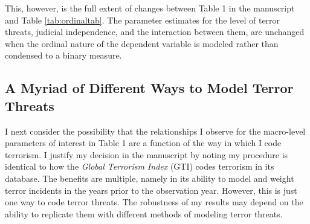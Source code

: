 \documentclass[11pt,]{article}
\begin{document}
This, however, is the full extent of changes between Table 1 in the
manuscript and Table \ref{tab:ordinaltab}. The parameter estimates for
the level of terror threats, judicial independence, and the interaction
between them, are unchanged when the ordinal nature of the dependent
variable is modeled rather than condensed to a binary measure.

\subsection{A Myriad of Different Ways to Model Terror
Threats}\label{a-myriad-of-different-ways-to-model-terror-threats}

I next consider the possibility that the relationships I observe for the
macro-level parameters of interest in Table 1 are a function of the way
in which I code terrorism. I justify my decision in the manuscript by
noting my procedure is identical to how the \emph{Global Terrorism
Index} (GTI) \citeyearpar{gti2014} codes terrorism in its database. The
benefits are multiple, namely in its ability to model and weight terror
incidents in the years prior to the observation year. However, this is
just one way to code terror threats. The robustness of my results may
depend on the ability to replicate them with different methods of
modeling terror threats.
\end{document}
